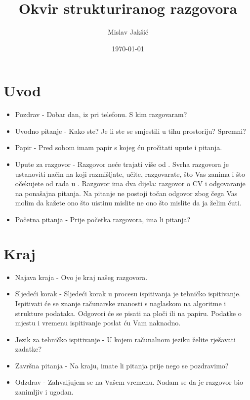 \documentclass{article}
\title{Okvir strukturiranog razgovora}
\author{Mislav Jakšić}
\date{\today}
\begin{document}
\maketitle



\section{Uvod}

\begin{itemize}
  \item Pozdrav - Dobar dan,  iz  pri telefonu. S kim razgovaram?
  \item Uvodno pitanje - Kako ste? Je li ste se smjestili u tihu prostoriju? Spremni?
  \item Papir - Pred sobom imam papir s kojeg ću pročitati upute i pitanja.
  \item Upute za razgovor - Razgovor neće trajati više od . Svrha razgovora je ustanoviti način na koji razmišljate, učite, razgovarate, što Vas zanima i što očekujete od rada u . Razgovor ima dva dijela: razgovor o CV i odgovaranje na ponašajna pitanja. Na pitanje ne postoji točan odgovor zbog čega Vas molim da kažete ono što uistinu mislite ne ono što mislite da ja želim čuti.
  \item Početna pitanja - Prije početka razgovora, ima li pitanja?
\end{itemize}



\newpage
\section{Kraj}

\begin{itemize}
  \item Najava kraja - Ovo je kraj našeg razgovora.
  \item Sljedeći korak - Sljedeći korak u procesu ispitivanja je tehničko ispitivanje. Ispitivati će se znanje računarske znanosti s naglaskom na algoritme i strukture podataka. Odgovori će se pisati na ploči ili na papiru. Podatke o mjestu i vremenu ispitivanje poslat ću Vam naknadno.
  \item Jezik za tehničko ispitivanje - U kojem računalnom jeziku želite rješavati zadatke?
  \item Završna pitanja - Na kraju, imate li pitanja prije nego se pozdravimo?
  \item Odzdrav - Zahvaljujem se na Vašem vremenu. Nadam se da je razgovor bio zanimljiv i ugodan.
\end{itemize}
\end{document}
